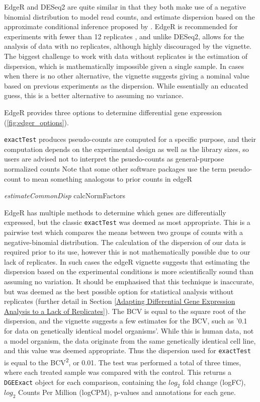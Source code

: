 EdgeR and DESeq2 are quite similar in that they both make use of a negative binomial distribution to model read counts, and estimate dispersion based on the approximate conditional inference proposed by \cite{cox1987parameter}. EdgeR is recommended for experiments with fewer than 12 replicates \citep{schurch2015evaluation}, and unlike DESeq2, allows for the analysis of data with no replicates, although highly discouraged by the vignette. The biggest challenge to work with data without replicates is the estimation of dispersion, which is mathematically impossible given a single sample. In cases when there is no other alternative, the vignette suggests giving a nominal value based on previous experiments as the dispersion. While essentially an educated guess, this is a better alternative to assuming no variance.

EdgeR provides three options to determine differential gene expression (\autoref{fig:edger_options}). 

\texttt{exactTest} produces pseudo-counts
are computed for a specific purpose, and their computation depends on the experimental
design as well as the library sizes, so users are advised not to interpret the psuedo-counts as general-purpose normalized counts
Note that some other software packages use the term pseudo-count to
mean something analogous to prior counts in edgeR


\textit{estimateCommonDisp}
calcNormFactors

EdgeR has multiple methods to determine which genes are differentially expressed, but the classic \texttt{exactTest} was deemed as most appropriate. This is a pairwise test which compares the means between two groups of counts with a negative-binomial distribution. The calculation of the dispersion of our data is required prior to its use, however this is not mathematically possible due to our lack of replicates. In such cases the edgeR vignette suggests that estimating the dispersion based on the experimental conditions is more scientifically sound than assuming no variation. It should be emphasised that this technique is inaccurate, but was deemed as the best possible option for statistical analysis without replicates (further detail in Section \ref{Adapting Differential Gene Expression Analysis to a Lack of Replicates}).
The \ac{BCV} is equal to the square root of the dispersion, and the vignette suggests a few estimates for the \ac{BCV}, such as '0.1 for data on genetically identical model organisms'. While this is human data, not a model organism, the data originate from the same genetically identical cell line, and this value was deemed appropriate. Thus the dispersion used for \texttt{exactTest} is equal to the BCV\textsuperscript{2}, or 0.01. 
The test was performed a total of three times, where each treated sample was compared with the control. This returns a \texttt{DGEExact} object for each comparison, containing the $log_{2}$ fold change (logFC), $log_{2}$ Counts Per Million (logCPM), p-values and annotations for each gene. 



